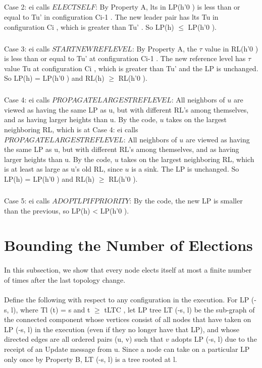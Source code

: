 \subparagraph{}Case 2: ei calls $ELECTSELF$: By Property A, lts in LP(h'0 ) is less than or equal to Tu' in configuration Ci-1 . The new leader pair has lts Tu in configuration Ci , which is greater than Tu' . So LP(h) $\leq$ LP(h'0 ).
\subparagraph{}Case 3: ei calls $STARTNEWREFLEVEL$: By Property A, the $\tau$ value in RL(h'0 ) is less than or equal to Tu' at configuration Ci-1 . The new reference level has $\tau$ value Tu at configuration Ci , which is greater than Tu' and the LP is unchanged. So LP(h) = LP(h'0 ) and RL(h) $\geq$ RL(h'0 ).
\subparagraph{}Case 4: ei calls $PROPAGATELARGESTREFLEVEL$: All neighbors of $u$ are viewed as having the same LP as u, but with different RL's among themselves, and as having larger heights than u. By the code, $u$ takes on the largest neighboring RL, which is at Case 4: ei calls $PROPAGATELARGESTREFLEVEL$: All neighbors of $u$ are viewed as having the same LP as u, but with different RL's among themselves, and as having larger heights than u. By the code, $u$ takes on the largest neighboring RL, which is at least as large as u's old RL, since $u$ is a sink. The LP is unchanged. So LP(h) = LP(h'0 ) and RL(h) $\geq$ RL(h'0 ).
\subparagraph{}Case 5: ei calls $ADOPTLPIFPRIORITY$: By the code, the new LP is smaller than the previous, so LP(h) < LP(h'0 ).
\section{Bounding the Number of Elections}
\paragraph{}In this subsection, we show that every node elects itself at most a finite number of times after the last topology change.
\paragraph{}Define the following with respect to any configuration in the execution. For LP (-s, l), where Tl (t) = s and t $\geq$ tLTC , let LP tree LT (-s, l) be the sub-graph of the connected component whose vertices consist of all nodes that have taken on LP (-s, l) in the execution (even if they no longer have that LP), and whose directed edges are all ordered pairs (u, v) such that $v$ adopts LP (-s, l) due to the receipt of an Update message from u. Since a node can take on a particular LP only once by Property B, LT (-s, l) is a tree rooted at l.
